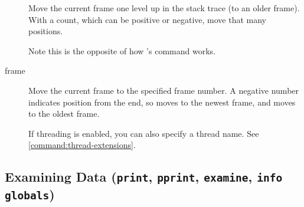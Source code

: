 \begin{description}
Move the current frame one level up in the stack trace (to an older
frame). With a count, which can be positive or negative,
move that many positions.

Note this is the opposite of how 's  command works.

\item[frame \optional{\var{position}}]
Move the current frame to the specified frame number. A negative
number indicates position from the end, so  moves to 
the newest frame, and  moves to the oldest frame.

If threading is enabled, you can also specify a thread name. See
\ref{command:thread-extensions}.

\end{description}

\subsection{Examining Data ({\tt print}, {\tt pprint}, {\tt examine}, {\tt info globals})\label{subsection-data}}

